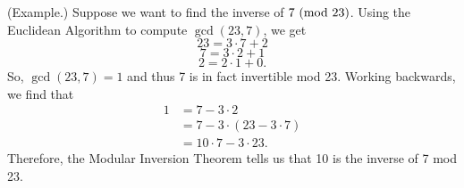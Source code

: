 \documentclass[letterpaper]{article}
\begin{document}
\begin{mdframed}
    (Example.) Suppose we want to find the inverse of $7 \ (\mathrm{mod}\ 23)$. Using the Euclidean Algorithm to compute $\gcd(23, 7)$, we get 
    \[23 = 3 \cdot 7 + 2\]
    \[7 = 3 \cdot 2 + 1\]
    \[2 = 2 \cdot 1 + 0.\]
    So, $\gcd(23, 7) = 1$ and thus 7 is in fact invertible mod 23. Working backwards, we find that 
    \begin{equation*}
        \begin{aligned}
            1 &= 7 - 3 \cdot 2 \\ 
                &= 7 - 3 \cdot (23 - 3 \cdot 7) \\ 
                &= 10 \cdot 7 - 3 \cdot 23.
        \end{aligned}
    \end{equation*}
    Therefore, the Modular Inversion Theorem tells us that 10 is the inverse of 7 mod 23. 
\end{mdframed}
\end{document}
